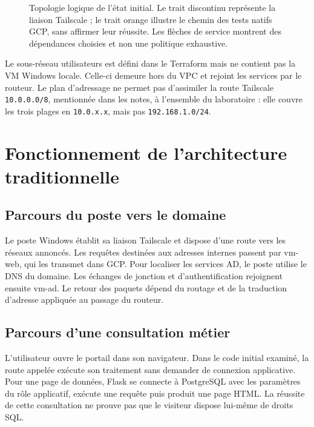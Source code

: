 \documentclass[a4paper,12pt]{report}
\begin{document}
\begin{figure}[H]
\endgroup
\caption[Topologie logique du laboratoire hybride]{Topologie logique de l'état initial. Le trait discontinu représente la liaison Tailscale ; le trait orange illustre le chemin des tests natifs GCP, sans affirmer leur réussite. Les flèches de service montrent des dépendances choisies et non une politique exhaustive.}
\label{fig:architecture}
\end{figure}

Le sous-réseau utilisateurs est défini dans le Terraform mais ne contient pas la VM Windows locale. Celle-ci demeure hors du VPC et rejoint les services par le routeur. Le plan d'adressage ne permet pas d'assimiler la route Tailscale \texttt{10.0.0.0/8}, mentionnée dans les notes, à l'ensemble du laboratoire : elle couvre les trois plages en \texttt{10.0.x.x}, mais pas \texttt{192.168.1.0/24}.

\section{Fonctionnement de l'architecture traditionnelle}
\subsection{Parcours du poste vers le domaine}
Le poste Windows établit sa liaison Tailscale et dispose d'une route vers les réseaux annoncés. Les requêtes destinées aux adresses internes passent par vm-web, qui les transmet dans GCP. Pour localiser les services AD, le poste utilise le DNS du domaine. Les échanges de jonction et d'authentification rejoignent ensuite vm-ad. Le retour des paquets dépend du routage et de la traduction d'adresse appliquée au passage du routeur.

\subsection{Parcours d'une consultation métier}
L'utilisateur ouvre le portail dans son navigateur. Dans le code initial examiné, la route appelée exécute son traitement sans demander de connexion applicative. Pour une page de données, Flask se connecte à PostgreSQL avec les paramètres du rôle applicatif, exécute une requête puis produit une page HTML. La réussite de cette consultation ne prouve pas que le visiteur dispose lui-même de droits SQL.
\end{document}
